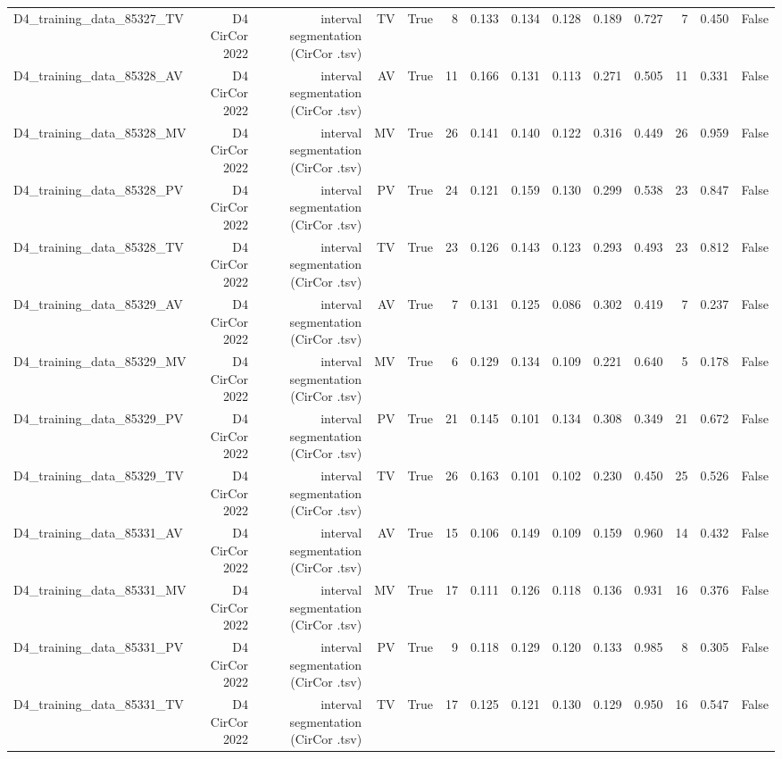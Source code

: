 \begin{table}[htbp]
\begin{tabular}{lrrrrrrrrrrrrr}
    D4\_training\_data\_85327\_TV & D4 CirCor 2022 & interval segmentation (CirCor .tsv) & TV & True & 8 & 0.133 & 0.134 & 0.128 & 0.189 & 0.727 & 7 & 0.450 & False \\
    D4\_training\_data\_85328\_AV & D4 CirCor 2022 & interval segmentation (CirCor .tsv) & AV & True & 11 & 0.166 & 0.131 & 0.113 & 0.271 & 0.505 & 11 & 0.331 & False \\
    D4\_training\_data\_85328\_MV & D4 CirCor 2022 & interval segmentation (CirCor .tsv) & MV & True & 26 & 0.141 & 0.140 & 0.122 & 0.316 & 0.449 & 26 & 0.959 & False \\
    D4\_training\_data\_85328\_PV & D4 CirCor 2022 & interval segmentation (CirCor .tsv) & PV & True & 24 & 0.121 & 0.159 & 0.130 & 0.299 & 0.538 & 23 & 0.847 & False \\
    D4\_training\_data\_85328\_TV & D4 CirCor 2022 & interval segmentation (CirCor .tsv) & TV & True & 23 & 0.126 & 0.143 & 0.123 & 0.293 & 0.493 & 23 & 0.812 & False \\
    D4\_training\_data\_85329\_AV & D4 CirCor 2022 & interval segmentation (CirCor .tsv) & AV & True & 7 & 0.131 & 0.125 & 0.086 & 0.302 & 0.419 & 7 & 0.237 & False \\
    D4\_training\_data\_85329\_MV & D4 CirCor 2022 & interval segmentation (CirCor .tsv) & MV & True & 6 & 0.129 & 0.134 & 0.109 & 0.221 & 0.640 & 5 & 0.178 & False \\
    D4\_training\_data\_85329\_PV & D4 CirCor 2022 & interval segmentation (CirCor .tsv) & PV & True & 21 & 0.145 & 0.101 & 0.134 & 0.308 & 0.349 & 21 & 0.672 & False \\
    D4\_training\_data\_85329\_TV & D4 CirCor 2022 & interval segmentation (CirCor .tsv) & TV & True & 26 & 0.163 & 0.101 & 0.102 & 0.230 & 0.450 & 25 & 0.526 & False \\
    D4\_training\_data\_85331\_AV & D4 CirCor 2022 & interval segmentation (CirCor .tsv) & AV & True & 15 & 0.106 & 0.149 & 0.109 & 0.159 & 0.960 & 14 & 0.432 & False \\
    D4\_training\_data\_85331\_MV & D4 CirCor 2022 & interval segmentation (CirCor .tsv) & MV & True & 17 & 0.111 & 0.126 & 0.118 & 0.136 & 0.931 & 16 & 0.376 & False \\
    D4\_training\_data\_85331\_PV & D4 CirCor 2022 & interval segmentation (CirCor .tsv) & PV & True & 9 & 0.118 & 0.129 & 0.120 & 0.133 & 0.985 & 8 & 0.305 & False \\
    D4\_training\_data\_85331\_TV & D4 CirCor 2022 & interval segmentation (CirCor .tsv) & TV & True & 17 & 0.125 & 0.121 & 0.130 & 0.129 & 0.950 & 16 & 0.547 & False \\

\end{tabular}
\end{table}
